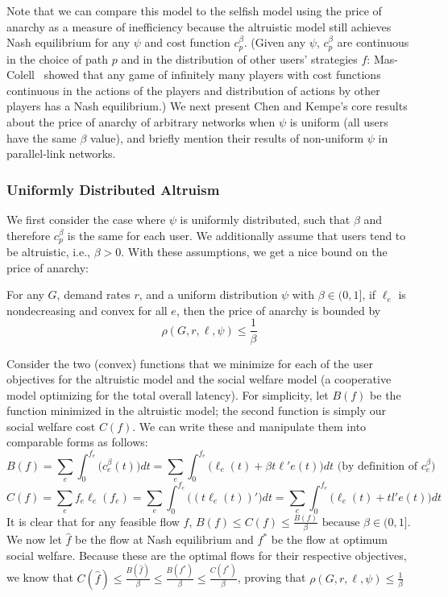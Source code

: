 Note that we can compare this model to the selfish model using the price of anarchy as a measure of inefficiency
because the altruistic model still achieves Nash equilibrium for any $\psi$ and cost function $c^\beta_p$. (Given any $\psi$, $c^\beta_p$ are continuous in the choice of path $p$ and in the distribution of other users' strategies $f$: Mas-Colell~\cite{mascolell} showed that any game of infinitely many players with cost functions continuous in the actions of the players and distribution of actions by other players has a Nash equilibrium.)
We next present Chen and Kempe's core results about the price of anarchy of arbitrary networks when $\psi$ is uniform (all users have the same $\beta$ value), and briefly mention their results of non-uniform $\psi$ in parallel-link networks.

\subsubsection{Uniformly Distributed Altruism}
We first consider the case where $\psi$ is uniformly distributed, such that $\beta$ and therefore $c^\beta_p$ is the same for each user. We additionally assume that users tend to be altruistic, i.e., $\beta > 0$.
With these assumptions, we get a nice bound on the price of anarchy:
\begin{theorem}
For any $G$, demand rates $r$, and 
a uniform distribution $\psi$ with $\beta \in (0, 1]$,
if $\ell_e$ is nondecreasing and convex for all $e$, then the price of anarchy is bounded by 
    $$\rho(G,r,\ell,\psi) \le \frac{1}{\beta}$$
\end{theorem}

\begin{proof-sketch}
    Consider the two (convex) functions that we minimize for each of the user objectives
    for the altruistic model and the social welfare model (a cooperative model optimizing for the total overall latency).
    For simplicity, let $B(f)$ be the function minimized in the altruistic model; the second function is simply our social welfare cost $C(f)$.
    We can write these and manipulate them into comparable forms as follows:
    $$B(f) = \sum_e\int_0^{{f}_e}\Big(c_e^\beta(t)\Big)dt = 
        \sum_e\int_0^{{f}_e} \Big(\ell_e(t) + \beta t\ell'e(t)\Big)dt\text{ (by definition of $c^\beta_e$)}$$
    $$C(f) = \sum_ef_e\ell_e(f_e) = \sum_e\int_0^{f_e} \Big((t\ell_e(t))' \Big)dt 
        = \sum_e\int_0^{f_e} \Big(\ell_e(t) + tl'e(t)\Big)dt$$ 
    It is clear that for any feasible flow $f$, 
    $B(f) \le C(f) \le \frac{B(f)}{\beta} \text{ because $\beta\in(0,1]$}$.
    We now let $\hat{f}$ be the flow at Nash equilibrium and $f^*$ be the flow at optimum social welfare. Because these are the optimal flows for their respective objectives, we know that 
    $C(\hat{f}) \le \frac{B(\hat{f})}{\beta} \le \frac{B(f^*)}{\beta} \le \frac{C(f^*)}{\beta}$,
    proving that 
    $\rho(G,r,\ell,\psi) \le \frac{1}{\beta}$
\end{proof-sketch}

